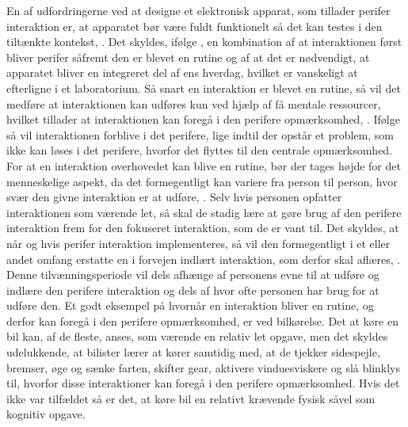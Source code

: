 En af udfordringerne ved at designe et elektronisk apparat, som tillader perifer interaktion er, at apparatet bør være fuldt funktionelt så det kan testes i den tiltænkte kontekst, \parencite[s. 21]{PDF:EvaluatingPI}. Det skyldes, ifølge \textcite[s. 22]{PDF:EvaluatingPI}, en kombination af at interaktionen først bliver perifer såfremt den er blevet en rutine og af at det er nødvendigt, at apparatet bliver en integreret del af ens hverdag, hvilket er vanskeligt at efterligne i et laboratorium. Så snart en interaktion er blevet en rutine, så vil det medføre at interaktionen kan udføres kun ved hjælp af få mentale ressourcer, hvilket tillader at interaktionen kan foregå i den perifere opmærksomhed, \parencite[s. 2]{PDF:FacilitatingPIDesignAndEvaluation}. Ifølge \textcite[s. 14]{PDF:PIUnseenKap2} så vil interaktionen forblive i det perifere, lige indtil der opstår et problem, som ikke kan løses i det perifere, hvorfor det flyttes til den centrale opmærksomhed. For at en interaktion overhovedet kan blive en rutine, bør der tages højde for det menneskelige aspekt, da det formegentligt kan variere fra person til person, hvor svær den givne interaktion er at udføre, \parencite[s. 248]{PDF:PICharacteristicsAndConsiderations}. Selv hvis personen opfatter interaktionen som værende let, så skal de stadig lære at gøre brug af den perifere interaktion frem for den fokuseret interaktion, som de er vant til. Det skyldes, at når og hvis perifer interaktion implementeres, så vil den formegentligt i et eller andet omfang erstatte en i forvejen indlært interaktion, som derfor skal aflæres, \parencite[s. 248]{PDF:PICharacteristicsAndConsiderations}. Denne tilvænningsperiode vil dels afhænge af personens evne til at udføre og indlære den perifere interaktion og dels af hvor ofte personen har brug for at udføre den. Et godt eksempel på hvornår en interaktion bliver en rutine, og derfor kan foregå i den perifere opmærksomhed, er ved bilkørelse. Det at køre en bil kan, af de fleste, anses, som værende en relativ let opgave, men det skyldes udelukkende, at bilister lærer at kører samtidig med, at de tjekker sidespejle, bremser, øge og sænke farten, skifter gear, aktivere vinduesviskere og slå blinklys til, hvorfor disse interaktioner kan foregå i den perifere opmærksomhed. Hvis det ikke var tilfældet så er det, at køre bil en relativt krævende fysisk såvel som kognitiv opgave. \blankline 
%
